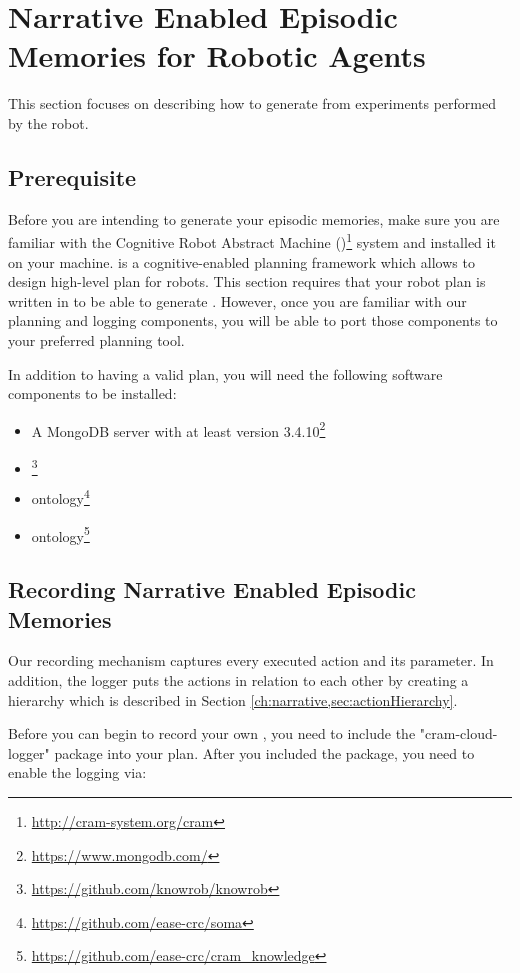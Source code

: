 \section{Narrative Enabled Episodic Memories for Robotic Agents}
\label{sec:robot-neem}
\lstset{style=lispcode}
This section focuses on describing how to generate \neems from experiments performed by the robot. 

\subsection{Prerequisite}

Before you are intending to generate your episodic memories, make sure you are familiar with the Cognitive Robot Abstract Machine (\cram)\footnote{\url{http://cram-system.org/cram}} system and installed it on your machine.
\cram is a cognitive-enabled planning framework which allows to design high-level plan for robots.
This section requires that your robot plan is written in \cram to be able to generate \neems.
However, once you are familiar with our planning and logging components, you will be able to port those components to your preferred planning tool.

In addition to having a valid \cram plan, you will need the following software components to be installed:
\begin{itemize}
	\item A MongoDB server with at least version 3.4.10\footnote{\url{https://www.mongodb.com/}}
	\item \knowrob\footnote{\url{https://github.com/knowrob/knowrob}}
	\item \soma ontology\footnote{\url{https://github.com/ease-crc/soma}}
	\item \cram ontology\footnote{\url{https://github.com/ease-crc/cram\_knowledge}}
\end{itemize}


\subsection{Recording Narrative Enabled Episodic Memories}
Our recording mechanism  captures every executed \cram action and its parameter.
In addition, the logger puts the actions in relation to each other by creating a hierarchy which is described in Section \ref{ch:narrative,sec:actionHierarchy}.

Before you can begin to record your own \neems, you need to include the "cram-cloud-logger" package into your \cram plan.
After you included the package, you need to enable the logging via:


